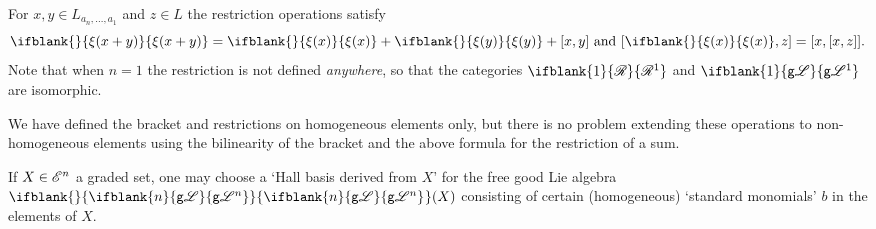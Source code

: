 \documentclass[10pt]{article}
\newcommand{\GS}[1]{\scrE^{#1}}
\newcommand{\GoodLie}[1]%
{\ifblank{#1}{\mathsf{g}{\scrL}}{\mathsf{g}{\scrL}^{#1}}}
\newcommand{\BadLie}[1]%
{\ifblank{#1}{\mathsf{b}{\scrL}}{\mathsf{b}{\scrL}^{#1}}}
\newcommand{\PRLie}[1]%
{\ifblank{#1}{\scrR}{\scrR^{#1}}}
\newcommand{\Fr}[2][]{\ifblank{#1}{#2}{#2_{#1}}}
\newcommand{\restn}[2][]{\ifblank{#1}{\xi{#2}}{\xi_{#1}{#2}}}%
\begin{document}
\begin{CategoriesOfInterest}
\begin{itemize}
For $x,y\in L_{a_n,\ldots,a_1}$ and $z\in L$ the restriction operations satisfy \[\restn{(x+y)}=\restn{(x)}+\restn{(y)}+[x,y]\textup{ and }[\restn{(x)},z]=[x,[x,z]].\]
Note that when $n=1$ the restriction is not defined \emph{anywhere}, so that the categories $\PRLie{1}$ and $\GoodLie{1}$ are isomorphic.
\end{itemize}
We have defined the bracket and restrictions on homogeneous elements only, but there is no problem extending these operations to non-homogeneous elements using the bilinearity of the bracket and the above formula for the restriction of a sum.

If $X\in\GS{n}$ a graded set, one may choose a `Hall basis derived from $X$' \cite{MR0038336} for the free good Lie algebra $\Fr{\GoodLie{n}}(X)$ consisting of certain (homogeneous) `standard monomials' $b$ in the elements of $X$.


\end{CategoriesOfInterest}
\end{document}
